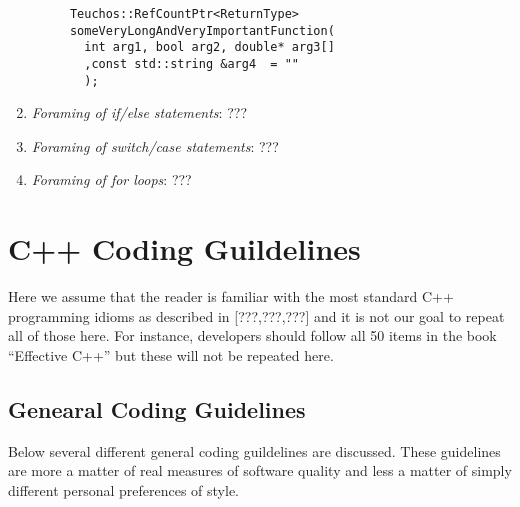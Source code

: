 \begin{enumerate}
\begin{enumerate}
  \begin{verbatim}
  Teuchos::RefCountPtr<ReturnType>
  someVeryLongAndVeryImportantFunction(
    int arg1, bool arg2, double* arg3[]
    ,const std::string &arg4  = ""
    );
  \end{verbatim}

  \end{enumerate}

{}\item\textit{Foraming of if/else statements}: ???

{}\item\textit{Foraming of switch/case statements}: ???

{}\item\textit{Foraming of for loops}: ???

\end{enumerate}

%
\section{C++ Coding Guildelines}
%

Here we assume that the reader is familiar with the most standard C++
programming idioms as described in [???,???,???] and it is not our goal to
repeat all of those here.  For instance, developers should follow all 50 items
in the book ``Effective C++'' but these will not be repeated here.

%
\subsection{Genearal Coding Guidelines}
%

Below several different general coding guildelines are discussed.  These
guidelines are more a matter of real measures of software quality and less a
matter of simply different personal preferences of style.

